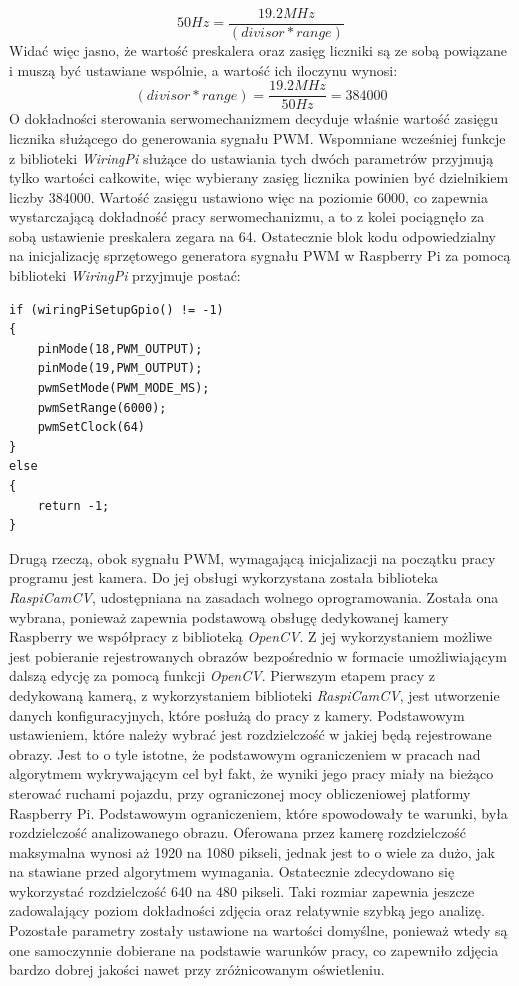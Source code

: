 \begin{equation}
50 Hz = \frac{19.2 MHz}{(divisor * range)}
\label{eq:hard_pwmN}
\end{equation}
Widać więc jasno, że wartość preskalera oraz zasięg liczniki są ze sobą powiązane i muszą być ustawiane wspólnie, a wartość ich iloczynu wynosi:
\begin{equation}
(divisor * range) = \frac{19.2 MHz}{50 Hz} = 384000
\label{eq:range_x_presc}
\end{equation}
O dokładności sterowania serwomechanizmem decyduje właśnie wartość zasięgu licznika służącego do generowania sygnału PWM. Wspomniane wcześniej funkcje z biblioteki \textit{WiringPi} służące do ustawiania tych dwóch parametrów przyjmują tylko wartości całkowite, więc wybierany zasięg licznika powinien być dzielnikiem liczby $384000$. Wartość zasięgu ustawiono więc na poziomie 6000, co zapewnia wystarczającą dokładność pracy serwomechanizmu, a to z kolei pociągnęło za sobą ustawienie preskalera zegara na 64. Ostatecznie blok kodu odpowiedzialny na inicjalizację sprzętowego generatora sygnału PWM w Raspberry Pi za pomocą biblioteki \textit{WiringPi} przyjmuje postać:
\begin{lstlisting}[caption=Inicjalizacja sygnałów PWM Raspberry]
if (wiringPiSetupGpio() != -1)
{
	pinMode(18,PWM_OUTPUT);
	pinMode(19,PWM_OUTPUT);
	pwmSetMode(PWM_MODE_MS);
	pwmSetRange(6000);
	pwmSetClock(64)
}
else
{
	return -1;
}
\end{lstlisting}

Drugą rzeczą, obok sygnału PWM, wymagającą inicjalizacji na początku pracy programu jest kamera. Do jej obsługi wykorzystana została biblioteka \textit{RaspiCamCV}, udostępniana na zasadach wolnego oprogramowania. Została ona wybrana, ponieważ zapewnia podstawową obsługę dedykowanej kamery Raspberry we współpracy z biblioteką \textit{OpenCV}. Z jej wykorzystaniem możliwe jest pobieranie rejestrowanych obrazów bezpośrednio w formacie umożliwiającym dalszą edycję za pomocą funkcji \textit{OpenCV}. Pierwszym etapem pracy z dedykowaną kamerą, z wykorzystaniem biblioteki \textit{RaspiCamCV}, jest utworzenie danych konfiguracyjnych, które posłużą do pracy z kamery. Podstawowym ustawieniem, które należy wybrać jest rozdzielczość w jakiej będą rejestrowane obrazy. Jest to o tyle istotne, że podstawowym ograniczeniem w pracach nad algorytmem wykrywającym cel był fakt, że wyniki jego pracy miały na bieżąco sterować ruchami pojazdu, przy ograniczonej mocy obliczeniowej platformy Raspberry Pi. Podstawowym ograniczeniem, które spowodowały te warunki, była rozdzielczość analizowanego obrazu. Oferowana przez kamerę rozdzielczość maksymalna wynosi aż 1920 na 1080 pikseli, jednak jest to o wiele za dużo, jak na stawiane przed algorytmem wymagania. Ostatecznie zdecydowano się wykorzystać rozdzielczość 640 na 480 pikseli. Taki rozmiar zapewnia jeszcze zadowalający poziom dokładności zdjęcia oraz relatywnie szybką jego analizę. Pozostałe parametry zostały ustawione na wartości domyślne, ponieważ wtedy są one samoczynnie dobierane na podstawie warunków pracy, co zapewniło zdjęcia bardzo dobrej jakości nawet przy zróżnicowanym oświetleniu.

